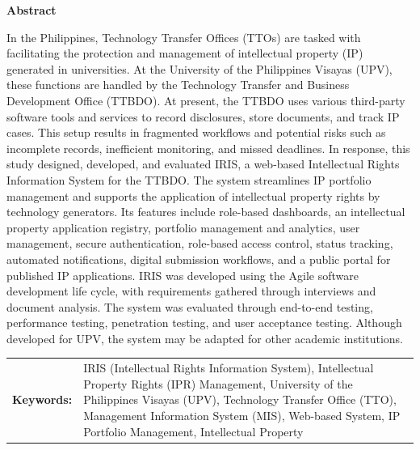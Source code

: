\begin{center}
\textbf{Abstract}
\end{center}
\setlength{\parindent}{0pt}
In the Philippines, Technology Transfer Offices (TTOs) are tasked with facilitating the protection and management of intellectual property (IP) generated in universities. At the University of the Philippines Visayas (UPV), these functions are handled by the Technology Transfer and Business Development Office (TTBDO). At present, the TTBDO uses various third-party software tools and services to record disclosures, store documents, and track IP cases. This setup results in fragmented workflows and potential risks such as incomplete records, inefficient monitoring, and missed deadlines. In response, this study designed, developed, and evaluated IRIS, a web-based Intellectual Rights Information System for the TTBDO. The system streamlines IP portfolio management and supports the application of intellectual property rights by technology generators. Its features include role-based dashboards, an intellectual property application registry, portfolio management and analytics, user management, secure authentication, role-based access control, status tracking, automated notifications, digital submission workflows, and a public portal for published IP applications. IRIS was developed using the Agile software development life cycle, with requirements gathered through interviews and document analysis. The system was evaluated through end-to-end testing, performance testing, penetration testing, and user acceptance testing. Although developed for UPV, the system may be adapted for other academic institutions.

\begin{tabular}{lp{4.25in}}
\hspace{-0.5em}\textbf{Keywords:}\hspace{0.25em} & IRIS (Intellectual Rights Information System), Intellectual Property Rights (IPR) Management, University of the Philippines Visayas (UPV), Technology Transfer Office (TTO), Management Information System (MIS), Web-based System, IP Portfolio Management, Intellectual Property\\
\end{tabular}